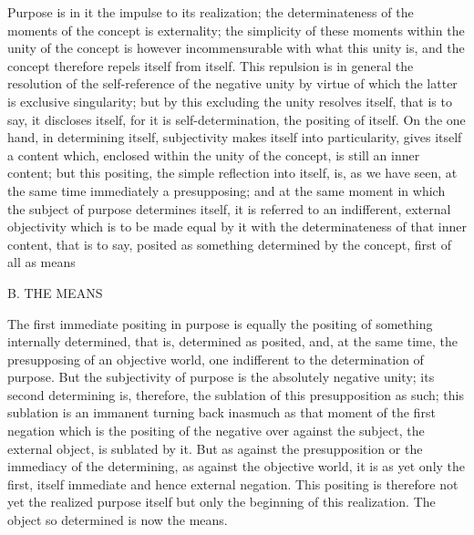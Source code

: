 Purpose is in it the impulse to its realization;
the determinateness of the moments
of the concept is externality;
the simplicity of these moments
within the unity of the concept is
however incommensurable with what this unity is,
and the concept therefore repels itself from itself.
This repulsion is in general the resolution of
the self-reference of the negative unity
by virtue of which the latter is exclusive singularity;
but by this excluding the unity resolves itself,
that is to say, it discloses itself,
for it is self-determination,
the positing of itself.
On the one hand, in determining itself,
subjectivity makes itself into particularity,
gives itself a content which,
enclosed within the unity of the concept,
is still an inner content;
but this positing, the simple reflection into itself,
is, as we have seen, at the same time
immediately a presupposing;
and at the same moment in which
the subject of purpose determines itself,
it is referred to an indifferent, external objectivity
which is to be made equal by it
with the determinateness of that inner content,
that is to say, posited as something determined by the concept,
first of all as means

B. THE MEANS

The first immediate positing in purpose is
equally the positing of something internally determined,
that is, determined as posited, and, at the same time,
the presupposing of an objective world,
one indifferent to the determination of purpose.
But the subjectivity of purpose is
the absolutely negative unity;
its second determining is, therefore,
the sublation of this presupposition as such;
this sublation is an immanent turning back
inasmuch as that moment of the first negation
which is the positing of the negative over against the subject,
the external object, is sublated by it.
But as against the presupposition
or the immediacy of the determining,
as against the objective world,
it is as yet only the first,
itself immediate and hence external negation.
This positing is therefore not yet
the realized purpose itself
but only the beginning of this realization.
The object so determined is now the means.

